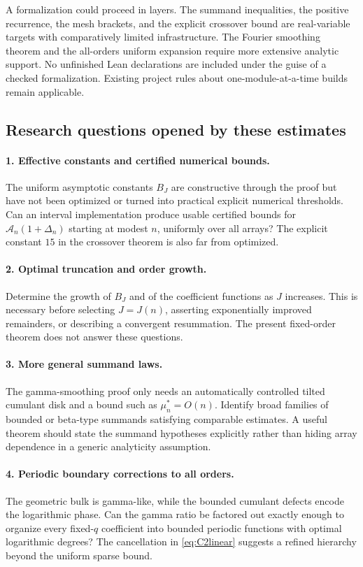 \documentclass[11pt,a4paper]{article}
\numberwithin{equation}{section}
\theoremstyle{definition}\newtheorem{definition}[theorem]{Definition}
\theoremstyle{remark}\newtheorem{remark}[theorem]{Remark}
\newcommand{\A}{\mathcal A}
\begin{document}
A formalization could proceed in layers. The summand inequalities, the positive recurrence, the mesh brackets, and the explicit crossover bound are real-variable targets with comparatively limited infrastructure. The Fourier smoothing theorem and the all-orders uniform expansion require more extensive analytic support. No unfinished Lean declarations are included under the guise of a checked formalization. Existing project rules about one-module-at-a-time builds remain applicable.

\subsection{Research questions opened by these estimates}
\paragraph{1. Effective constants and certified numerical bounds.}
The uniform asymptotic constants $B_J$ are constructive through the proof but have not been optimized or turned into practical explicit numerical thresholds. Can an interval implementation produce usable certified bounds for $\A_n(1+\Delta_n)$ starting at modest $n$, uniformly over all arrays? The explicit constant $15$ in the crossover theorem is also far from optimized.

\paragraph{2. Optimal truncation and order growth.}
Determine the growth of $B_J$ and of the coefficient functions as $J$ increases. This is necessary before selecting $J=J(n)$, asserting exponentially improved remainders, or describing a convergent resummation. The present fixed-order theorem does not answer these questions.

\paragraph{3. More general summand laws.}
The gamma-smoothing proof only needs an automatically controlled tilted cumulant disk and a bound such as $\mu_n^*=O(n)$. Identify broad families of bounded or beta-type summands satisfying comparable estimates. A useful theorem should state the summand hypotheses explicitly rather than hiding array dependence in a generic analyticity assumption.

\paragraph{4. Periodic boundary corrections to all orders.}
The geometric bulk is gamma-like, while the bounded cumulant defects encode the logarithmic phase. Can the gamma ratio be factored out exactly enough to organize every fixed-$q$ coefficient into bounded periodic functions with optimal logarithmic degrees? The cancellation in \eqref{eq:C2linear} suggests a refined hierarchy beyond the uniform sparse bound.
\end{document}
